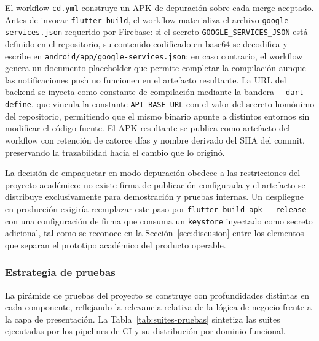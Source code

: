El workflow \texttt{cd.yml} construye un APK de depuración sobre
cada merge aceptado. Antes de invocar \texttt{flutter build}, el
workflow materializa el archivo \texttt{google-services.json}
requerido por Firebase: si el secreto
\texttt{GOOGLE\_SERVICES\_JSON} está definido en el repositorio, su
contenido codificado en base64 se decodifica y escribe en
\texttt{android/app/google-services.json}; en caso contrario, el
workflow genera un documento placeholder que permite completar la
compilación aunque las notificaciones push no funcionen en el
artefacto resultante. La URL del backend se inyecta como constante
de compilación mediante la bandera \texttt{-{}-dart-define}, que
vincula la constante \texttt{API\_BASE\_URL} con el valor del
secreto homónimo del repositorio, permitiendo que el mismo binario
apunte a distintos entornos sin modificar el código fuente. El APK resultante se publica como
artefacto del workflow con retención de catorce días y nombre
derivado del SHA del commit, preservando la trazabilidad hacia el
cambio que lo originó.

La decisión de empaquetar en modo depuración obedece a las
restricciones del proyecto académico: no existe firma de
publicación configurada y el artefacto se distribuye exclusivamente
para demostración y pruebas internas. Un despliegue en producción
exigiría reemplazar este paso por \texttt{flutter build apk
-{}-release} con una configuración de firma que consuma un
\texttt{keystore} inyectado como secreto adicional, tal como se
reconoce en la Sección~\ref{sec:discusion} entre los elementos que
separan el prototipo académico del producto operable.

\subsubsection{Estrategia de pruebas}

La pirámide de pruebas del proyecto se construye con profundidades
distintas en cada componente, reflejando la relevancia relativa de
la lógica de negocio frente a la capa de presentación. La
Tabla~\ref{tab:suites-pruebas} sintetiza las suites ejecutadas por
los pipelines de CI y su distribución por dominio funcional.

